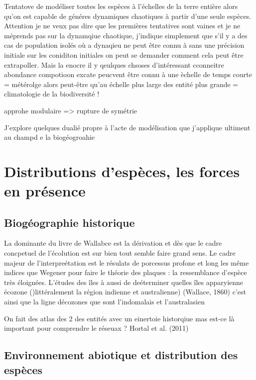 Tentatove de modéliser toutes les espèces à l'échelles de la terre
entière alors qu'on est capable de généres dynamiques chaotiques à
partir d'une seule espèces. Attention je ne veux pas dire que les
premières tentatives sont vaines et je ne méprends pas sur la dynamqiue
chaotique, j'indique simplement que s'il y a des cas de population
isolés où a dynaqieu ne peut être connu à sans une précision initiale
sur les coniditon initiales on peut se demander comment cela peut être
extrapoller. Mais la enocre il y qeulques chsoses d'intéressant
cconneitre abondance compotioon excate peucvent être connu à une èchelle
de temps courte = métérolge alors peut-être qu'au échelle plus large des
entité plus grande = climatologie de la biodiversité !

approhe modulaire =\textgreater{} rupture de symétrie

J'explore quelques dualié propre à l'acte de modélisation que j'applique
ultiment au champd e la biogéogroahie

\section*{Distributions d'espèces, les forces en
présence}\label{distributions-despuxe8ces-les-forces-en-pruxe9sence}

\subsection{Biogéographie historique}\label{bioguxe9ographie-historique}

La dominante du livre de Wallabce est la dérivation et dès que le cadre
concpetuel de l'écolution est sur bien tout semble faire grand sens. Le
cadre majeur de l'interpreétation est le résulats de porcessus profone
et long les même indices que Wegener pour faire le théorie des plaques :
la ressemblance d'espèce très éloignées. L'études des îles à aussi de
deéterminer quelles îles apparyienne écozone ()littéralement la région
indienne et australienne) (Wallace, 1860) c'est ainsi que la ligne
décozones que sont l'indomalais et l'australasien

On fait des atlas des 2 des entités avec un einertoie historqiue mas
est-ce là important pour comprendre le réseuax ? Hortal et al. (2011)

\subsection*{Environnement abiotique et distribution des
espèces}\label{environnement-abiotique-et-distribution-des-espuxe8ces}

